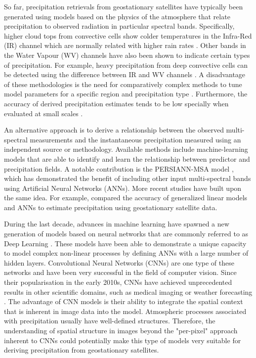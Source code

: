 \documentclass[3p,times]{elsarticle}
\begin{document}
So far, precipitation retrievals from geostationary satellites have typically been generated using models based on the physics of the atmosphere that relate precipitation to observed radiation in particular spectral bands. Specifically, higher cloud tops from convective cells show colder temperatures in the Infra-Red (IR) channel which are normally related with higher rain rates \citep{scofield1987nesdis,vicente1998operational}. Other bands in the Water Vapour (WV) channels have also been shown to indicate certain types of precipitation. For example, heavy precipitation from deep convective cells can be detected using the difference between IR and WV channels \citep{kurino1997satellite,schmetz1997monitoring}. A disadvantage of these methodologies is the need for comparatively complex methods to tune model parameters for a specific region and precipitation type \citep{aemetsaf2013}. Furthermore, the accuracy of derived precipitation estimates tends to be low specially when evaluated at small scales \citep{arkin1987relationship}.

An alternative approach is to derive a relationship between the observed multi-spectral measurements and the instantaneous precipitation measured using an independent source or methodology. Available methods include machine-learning models that are able to identify and learn the relationship between predictor and precipitation fields. A notable contribution is the PERSIANN-MSA model \citep{behrangi2009persiann}, which has demonstrated the benefit of including other input multi-spectral bands using Artificial Neural Networks (ANNs). More recent studies have built upon the same idea. For example,  \citep{beusch2018satellite} compared the accuracy of generalized linear models and ANNs to estimate precipitation using geostationary satellite data. 

During the last decade, advances in machine learning have spawned a new generation of models based on neural networks that are commonly referred to as Deep Learning \citep{lecun2015deep}. These models have been able to demonstrate a unique capacity to model complex non-linear processes by defining ANNs with a large number of hidden layers. Convolutional Neural Networks (CNNs) are one type of these networks and have been very successful in the field of computer vision. Since their popularisation in the early 2010s, CNNs have achieved unprecedented results in other scientific domains, such as medical imaging \citep{ronneberger2015u} or weather forecasting \citep{larraondo2019data,rasp2020weatherbench}. The advantage of CNN models is their ability to integrate the spatial context that is inherent in image data into the model. Atmospheric processes associated with precipitation usually have well-defined structures. Therefore, the understanding of spatial structure in images beyond the "per-pixel" approach inherent to CNNs could potentially make this type of models very suitable for deriving precipitation from geostationary satellites. 
\end{document}
